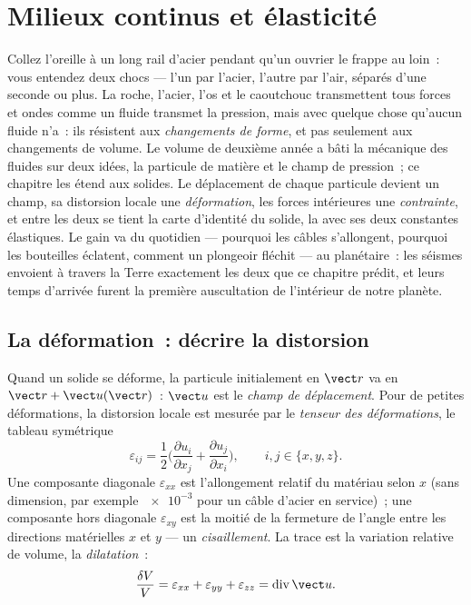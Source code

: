 \chapter{Milieux continus et élasticité}\label{ch:b3:continuum-elasticity}

Collez l'oreille à un long rail d'acier pendant qu'un ouvrier le frappe
au loin~: vous entendez deux chocs --- l'un par l'acier, l'autre par
l'air, séparés d'une seconde ou plus. La roche, l'acier, l'os et le
caoutchouc transmettent tous forces et ondes comme un fluide transmet
la pression, mais avec quelque chose qu'aucun fluide n'a~: ils
résistent aux \emph{changements de forme}, et pas seulement aux
changements de volume. Le volume de deuxième année a bâti la mécanique
des fluides sur deux idées, la particule de matière et le champ de
pression~; ce chapitre les étend aux solides. Le déplacement de chaque
particule devient un champ, sa distorsion locale une \emph{déformation},
les forces intérieures une \emph{contrainte}, et entre les deux se
tient la carte d'identité du solide, la  avec ses deux
constantes élastiques. Le gain va du quotidien --- pourquoi les câbles
s'allongent, pourquoi les bouteilles éclatent, comment un plongeoir
fléchit --- au planétaire~: les séismes envoient à travers la Terre
exactement les deux  que ce chapitre prédit, et leurs
temps d'arrivée furent la première auscultation de l'intérieur de notre
planète.

\section{La déformation~: décrire la distorsion}

\begin{definition}\label{def:b3:continuum-elasticity:strain}
Quand un solide se déforme, la particule initialement en $\vect r$ va
en $\vect r + \vect u(\vect r)$~: $\vect u$ est le \emph{champ de
déplacement}. Pour de petites déformations, la distorsion locale est
mesurée par le \emph{tenseur des déformations}, le tableau symétrique
\[
\varepsilon_{ij} = \frac12\Big(
 \frac{\partial u_i}{\partial x_j} + \frac{\partial u_j}{\partial x_i}
\Big) , \qquad i, j \in \{x, y, z\} .
\]
Une composante diagonale $\varepsilon_{xx}$ est l'allongement relatif
du matériau selon $x$ (sans dimension, par exemple $\num{e-3}$ pour un
câble d'acier en service)~; une composante hors diagonale
$\varepsilon_{xy}$ est la moitié de la fermeture de l'angle entre les
directions matérielles $x$ et $y$ --- un \emph{cisaillement}. La trace
est la variation relative de volume, la \emph{dilatation}~:
\[
\frac{\delta V}{V} = \varepsilon_{xx} + \varepsilon_{yy} +
\varepsilon_{zz} = \operatorname{div}\vect u .
\]
\end{definition}

